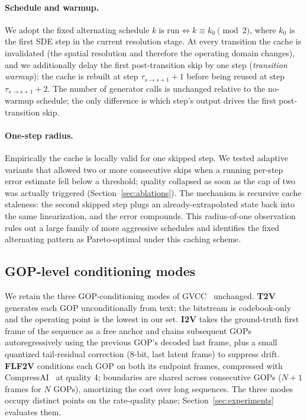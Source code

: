 \paragraph{Schedule and warmup.}
We adopt the fixed alternating schedule
$k\;\text{is run}\Leftrightarrow k\!\equiv\!k_0\pmod 2$, where $k_0$ is the
first SDE step in the current resolution stage. At every transition the
cache is invalidated (the spatial resolution and therefore the operating
domain changes), and we additionally delay the first post-transition skip
by one step (\emph{transition warmup}): the cache is rebuilt at step
$\tau_{s\to s+1}\!+\!1$ before being reused at step
$\tau_{s\to s+1}\!+\!2$. The number of generator calls is unchanged
relative to the no-warmup schedule; the only difference is which step's
output drives the first post-transition skip.

\paragraph{One-step radius.}
Empirically the cache is locally valid for one skipped step. We tested
adaptive variants that allowed two or more consecutive skips when a
running per-step error estimate fell below a threshold; quality collapsed
as soon as the cap of two was actually triggered (Section~\ref{sec:ablations}).
The mechanism is recursive cache staleness: the second skipped step plugs
an already-extrapolated state back into the same linearization, and the
error compounds. This radius-of-one observation rules out a large family
of more aggressive schedules and identifies the fixed alternating pattern
as Pareto-optimal under this caching scheme.

\subsection{GOP-level conditioning modes}
\label{sec:method-gop}

We retain the three GOP-conditioning modes of GVCC~\cite{zeng2026gvcc}
unchanged. \textbf{T2V} generates each GOP unconditionally from text;
the bitstream is codebook-only and the operating point is the lowest in
our set. \textbf{I2V} takes the ground-truth first frame of the sequence
as a free anchor and chains subsequent GOPs autoregressively using the
previous GOP's decoded last frame, plus a small quantized tail-residual
correction (8-bit, last latent frame) to suppress drift.
\textbf{FLF2V} conditions each GOP on both its endpoint frames,
compressed with CompressAI~\cite{begaint2020compressai} at quality 4;
boundaries are shared across consecutive GOPs ($N\!+\!1$ frames for $N$
GOPs), amortizing the cost over long sequences. The three modes occupy
distinct points on the rate-quality plane; Section~\ref{sec:experiments}
evaluates them.
